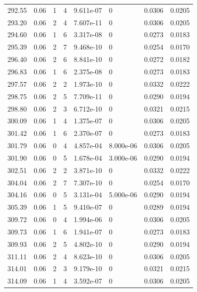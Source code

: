 \documentclass[preview]{standalone}
\begin{document}
{{{{{{{{\begin{tabular}{L{1.2cm}C{1.2cm} C{0.3cm}C{0.5cm} C{1.4cm}C{1.4cm} C{1.4cm}C{1.4cm}}
  292.55  &  0.06  & 1     &  4 &  9.611e-07  & 0  & 0.0306 &  0.0205   \\ 
  293.20  &  0.06  & 2     &  4 &  7.607e-11  & 0  & 0.0306 &  0.0205   \\ 
  294.60  &  0.06  & 1     &  6 &  3.317e-08  & 0  & 0.0273 &  0.0183   \\ 
  295.39  &  0.06  & 2     &  7 &  9.468e-10  & 0  & 0.0254 &  0.0170   \\ 
  296.40  &  0.06  & 2     &  6 &  8.841e-10  & 0  & 0.0272 &  0.0182   \\ 
  296.83  &  0.06  & 1     &  6 &  2.375e-08  & 0  & 0.0273 &  0.0183   \\ 
  297.57  &  0.06  & 2     &  2 &  1.973e-10  & 0  & 0.0332 &  0.0222   \\ 
  298.75  &  0.06  & 2     &  5 &  7.709e-11  & 0  & 0.0290 &  0.0194   \\ 
  298.80  &  0.06  & 2     &  3 &  6.712e-10  & 0  & 0.0321 &  0.0215   \\ 
  300.09  &  0.06  & 1     &  4 &  1.375e-07  & 0  & 0.0306 &  0.0205   \\ 
  301.42  &  0.06  & 1     &  6 &  2.370e-07  & 0  & 0.0273 &  0.0183   \\ 
  301.79  &  0.06  & 0     &  4 &  4.857e-04  & 8.000e-06  & 0.0306 &  0.0205   \\ 
  301.90  &  0.06  & 0     &  5 &  1.678e-04  & 3.000e-06  & 0.0290 &  0.0194   \\ 
  302.51  &  0.06  & 2     &  2 &  3.871e-10  & 0  & 0.0332 &  0.0222   \\ 
  304.04  &  0.06  & 2     &  7 &  7.307e-10  & 0  & 0.0254 &  0.0170   \\ 
  304.16  &  0.06  & 0     &  5 &  3.131e-04  & 5.000e-06  & 0.0290 &  0.0194   \\ 
  305.39  &  0.06  & 1     &  5 &  9.410e-07  & 0  & 0.0289 &  0.0194   \\ 
  309.72  &  0.06  & 0     &  4 &  1.994e-06  & 0  & 0.0306 &  0.0205   \\ 
  309.73  &  0.06  & 1     &  6 &  1.941e-07  & 0  & 0.0273 &  0.0183   \\ 
  309.93  &  0.06  & 2     &  5 &  4.802e-10  & 0  & 0.0290 &  0.0194   \\ 
  311.11  &  0.06  & 2     &  4 &  8.623e-10  & 0  & 0.0306 &  0.0205   \\ 
  314.01  &  0.06  & 2     &  3 &  9.179e-10  & 0  & 0.0321 &  0.0215   \\ 
  314.09  &  0.06  & 1     &  4 &  3.592e-07  & 0  & 0.0306 &  0.0205   \\ 

\end{tabular}}}}}}}}}
\end{document}
